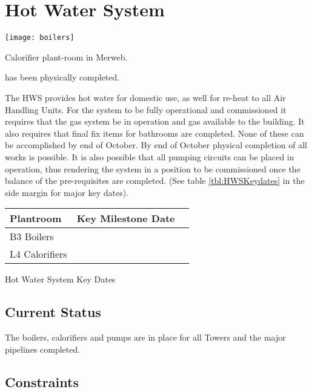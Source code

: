 \chapter{Hot Water System  }
\begin{marginfigure}
  \texttt{[image: boilers]}
  \caption{Calorifier plant-room in Merweb.}
  \label{fig:MWcalorifiers}
\end{marginfigure}

 has been physically completed.

The HWS provides hot water for domestic use, as well for re-heat to all Air Handling Units. For the system to be fully operational and commissioned it requires that the gas system  be in operation and gas available to the building. It also requires that final fix items for bathrooms are completed. None of these can be accomplished by end of October. By end of October physical completion of all works is possible. It is also possible that all pumping circuits can be placed in operation, thus rendering the system in a position to be commissioned once the balance of the pre-requisites are completed. (See table \ref{tbl:HWSKeydates} in the side margin for major key dates).


           \begin{margintable} 
	    \begin{tabular}{lcl}
	      \toprule
	      Plantroom    & Key Milestone Date  \\
	      \midrule
	      B3 Boilers             &  \podiumon  \\
	      L4 Calorifiers       &  \toweron  \\
	      \bottomrule
	    \end{tabular}
           \caption{Hot Water System Key Dates}
           \label{tbl:HWSKeydates}
            \end{margintable}
 

\section{Current Status}

The boilers, calorifiers and pumps are in place for all Towers and the major pipelines completed. 

\section{Constraints}

